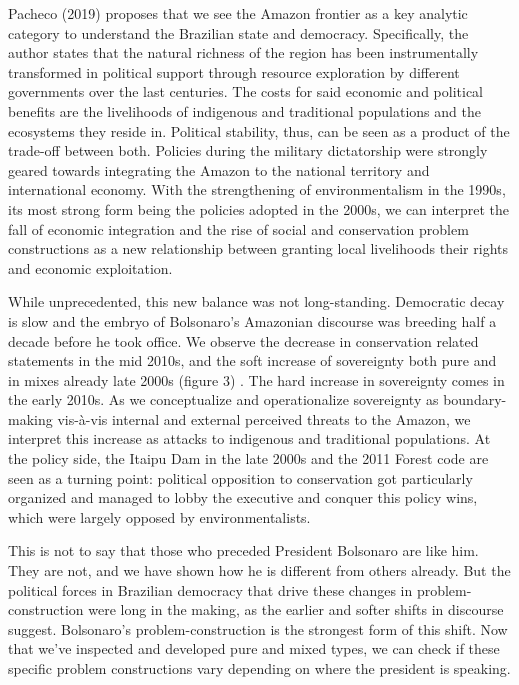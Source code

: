 \documentclass[
]{article}
\begin{document}
Pacheco (2019) proposes that we see the Amazon frontier as a key
analytic category to understand the Brazilian state and democracy.
Specifically, the author states that the natural richness of the region
has been instrumentally transformed in political support through
resource exploration by different governments over the last centuries.
The costs for said economic and political benefits are the livelihoods
of indigenous and traditional populations and the ecosystems they reside
in. Political stability, thus, can be seen as a product of the trade-off
between both. Policies during the military dictatorship were strongly
geared towards integrating the Amazon to the national territory and
international economy. With the strengthening of environmentalism in the
1990s, its most strong form being the policies adopted in the 2000s, we
can interpret the fall of economic integration and the rise of social
and conservation problem constructions as a new relationship between
granting local livelihoods their rights and economic exploitation.

While unprecedented, this new balance was not long-standing. Democratic
decay is slow and the embryo of Bolsonaro's Amazonian discourse was
breeding half a decade before he took office. We observe the decrease in
conservation related statements in the mid 2010s, and the soft increase
of sovereignty both pure and in mixes already late 2000s (figure 3) .
The hard increase in sovereignty comes in the early 2010s. As we
conceptualize and operationalize sovereignty as boundary-making
vis-à-vis internal and external perceived threats to the Amazon, we
interpret this increase as attacks to indigenous and traditional
populations. At the policy side, the Itaipu Dam in the late 2000s and
the 2011 Forest code are seen as a turning point: political opposition
to conservation got particularly organized and managed to lobby the
executive and conquer this policy wins, which were largely opposed by
environmentalists.

This is not to say that those who preceded President Bolsonaro are like
him. They are not, and we have shown how he is different from others
already. But the political forces in Brazilian democracy that drive
these changes in problem-construction were long in the making, as the
earlier and softer shifts in discourse suggest. Bolsonaro's
problem-construction is the strongest form of this shift. Now that we've
inspected and developed pure and mixed types, we can check if these
specific problem constructions vary depending on where the president is
speaking.
\end{document}
